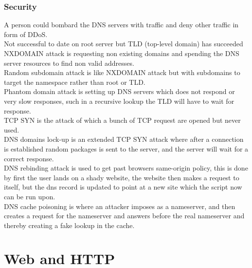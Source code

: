 \documentclass[12pt, a4paper]{article}
\begin{document}
			\subsubsection{Security}
				A person could bombard the DNS servers with traffic and deny other traffic in form of DDoS.\\
				Not successful to date on root server but TLD (top-level domain) has succeeded\\
				NXDOMAIN attack is requesting non existing domains and spending the DNS server resources to find non valid addresses.\\
				Random subdomain attack is like NXDOMAIN attack but with subdomains to target the namespace rather than root or TLD.\\
				Phantom domain attack is setting up DNS servers which does not respond or very slow responses, such in a recursive lookup the TLD will have to wait for response.\\
				TCP SYN is the attack of which a bunch of TCP request are opened but never used.\\
				DNS domains lock-up is an extended TCP SYN attack where after a connection is established random packages is sent to the server, and the server will wait for a correct response.\\
				DNS rebinding attack is used to get past browsers same-origin policy, this is done by first the user lands on a shady website, the website then makes a request to itself, but the dns record is updated to point at a new site which the script now can be run upon.\\
				DNS cache poisoning is where an attacker imposes as a nameserver, and then creates a request for the nameserver and answers before the real nameserver and thereby creating a fake lookup in the cache.
	\section{Web and HTTP}
\end{document}
